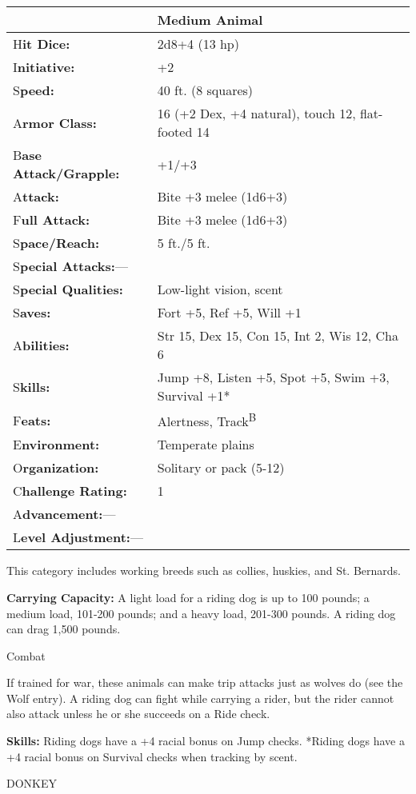 \documentclass{article}
\begin{document}
\begin{tabular}{|>{\raggedright}p{91pt}|>{\raggedright}p{211pt}|}
\hline
  & Medium Animal\tabularnewline
\hline
H\textbf{it Dice:} & 2d8+4 (13 hp)\tabularnewline
\hline
I\textbf{nitiative:} & +2\tabularnewline
\hline
S\textbf{peed:} & 40 ft. (8 squares)\tabularnewline
\hline
A\textbf{rmor Class:} & 16 (+2 Dex, +4 natural), touch 12, flat-footed 14\tabularnewline
\hline
B\textbf{ase Attack/Grapple:} & +1/+3\tabularnewline
\hline
A\textbf{ttack:} & Bite +3 melee (1d6+3)\tabularnewline
\hline
F\textbf{ull Attack:} & Bite +3 melee (1d6+3)\tabularnewline
\hline
S\textbf{pace/Reach:} & 5 ft./5 ft.\tabularnewline
\hline
S\textbf{pecial Attacks:}--- & \tabularnewline
\hline
S\textbf{pecial Qualities:} & Low-light vision, scent\tabularnewline
\hline
S\textbf{aves:} & Fort +5, Ref +5, Will +1\tabularnewline
\hline
A\textbf{bilities:} & Str 15, Dex 15, Con 15, Int 2, Wis 12, Cha 6\tabularnewline
\hline
S\textbf{kills:} & Jump +8, Listen +5, Spot +5, Swim +3, Survival +1*\tabularnewline
\hline
F\textbf{eats:} & Alertness, Track\textsuperscript{B}\tabularnewline
\hline
E\textbf{nvironment:} & Temperate plains\tabularnewline
\hline
O\textbf{rganization:} & Solitary or pack (5-12)\tabularnewline
\hline
C\textbf{hallenge Rating:} & 1\tabularnewline
\hline
A\textbf{dvancement:}--- & \tabularnewline
\hline
L\textbf{evel Adjustment:}--- & \tabularnewline
\hline
\end{tabular}

This category includes working breeds such as collies, huskies, and St. Bernards.

\textbf{Carrying Capacity:} A light load for a riding dog is up to 100 pounds; 
a medium load, 101-200 pounds; and a heavy load, 201-300 pounds. A riding dog can 
drag 1,500 pounds.

Combat

If trained for war, these animals can make trip attacks just as wolves do (see 
the Wolf entry). A riding dog can fight while carrying a rider, but the rider cannot 
also attack unless he or she succeeds on a Ride check.

\textbf{Skills:} Riding dogs have a +4 racial bonus on Jump checks. *Riding dogs 
have a +4 racial bonus on Survival checks when tracking by scent.

\vspace{12pt}
DONKEY
\end{document}
